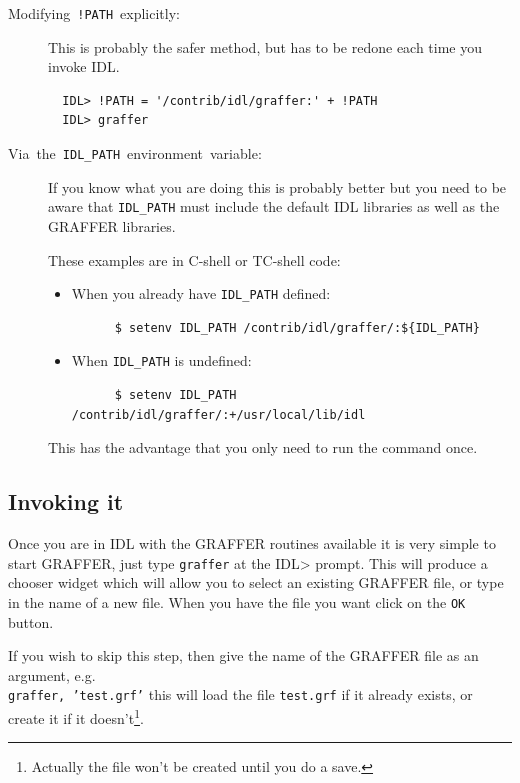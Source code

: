 \documentclass[11pt,twoside,english]{article}
\begin{document}
\begin{description}
\item [Modifying~\texttt{!PATH}~explicitly:]This is probably the safer
  method, but has to be redone each time you invoke IDL.
\begin{verbatim}
  IDL> !PATH = '/contrib/idl/graffer:' + !PATH
  IDL> graffer
\end{verbatim}

\item [Via~the~\texttt{IDL\_PATH}~environment~variable:]If you know
  what you are doing this is probably better but you need to be aware
  that \texttt{IDL\_PATH} must include the default IDL libraries as
  well as the GRAFFER libraries.


  These examples are in C-shell or TC-shell code:

  \begin{itemize}
  \item When you already have \texttt{IDL\_PATH} defined:
    \begin{verbatim}
      $ setenv IDL_PATH /contrib/idl/graffer/:${IDL_PATH}
    \end{verbatim}
  \item When \texttt{IDL\_PATH} is undefined:
    \begin{verbatim}
      $ setenv IDL_PATH /contrib/idl/graffer/:+/usr/local/lib/idl
    \end{verbatim}
  \end{itemize}
  This has the advantage that you only need to run the command once.

\end{description}

\subsection{Invoking it}

Once you are in IDL with the GRAFFER routines available it is very
simple to start GRAFFER, just type \texttt{graffer} at the IDL> prompt.
This will produce a chooser widget which will allow you to select an
existing GRAFFER file, or type in the name of a new file. When you have
the file you want click on the \texttt{OK} button.

If you wish to skip this step, then give the name of the GRAFFER file
as an argument, e.g. \texttt{}~\\
\texttt{graffer,~'test.grf'} this will load the file \texttt{test.grf}
if it already exists, or create it if it doesn't\footnote{Actually the
  file won't be created until you do a save.}.
\end{document}
